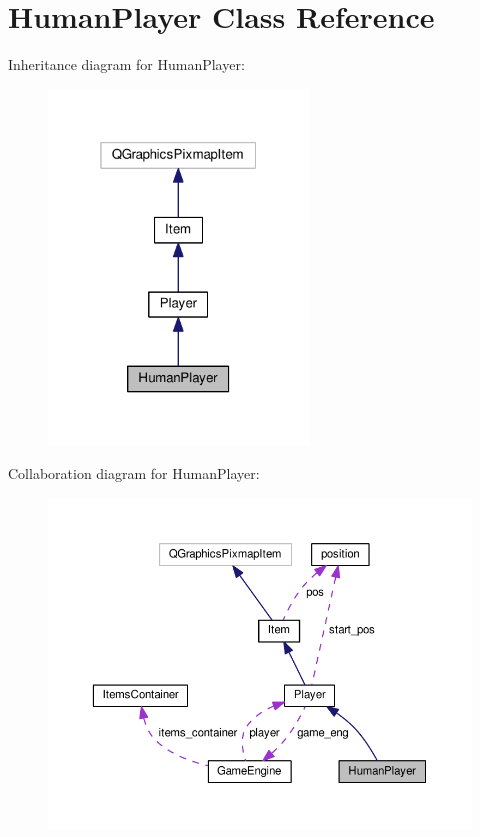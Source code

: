 \hypertarget{class_human_player}{}\section{Human\+Player Class Reference}
\label{class_human_player}


Inheritance diagram for Human\+Player\+:\nopagebreak
\begin{figure}[H]
\begin{center}
\leavevmode
\includegraphics[width=196pt]{class_human_player__inherit__graph}
\end{center}
\end{figure}


Collaboration diagram for Human\+Player\+:\nopagebreak
\begin{figure}[H]
\begin{center}
\leavevmode
\includegraphics[width=350pt]{class_human_player__coll__graph}
\end{center}
\end{figure}
